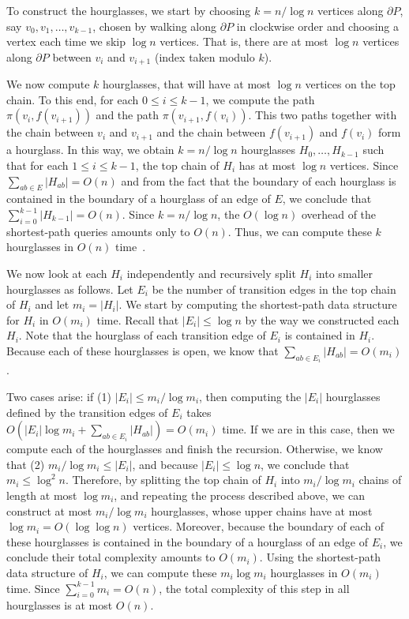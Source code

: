 \documentclass[a4paper,UKenglish]{lipics}
\newcommand{\ff}[1]{\ensuremath{f(#1)}}
\newcommand{\p}[2]{\ensuremath{\pi(#1, #2)}}
\begin{document}
To construct the hourglasses, we start by choosing $k = n/ \log n$ vertices along $\partial P$, say $v_0, v_1, \ldots, v_{k-1}$, chosen by walking along $\partial P$ in clockwise order and choosing a vertex each time we skip $\log n$ vertices. 
That is, there are at most $\log n$ vertices along $\partial P$ between $v_i$ and $v_{i+1}$ (index taken modulo $k$).

We now compute $k$ hourglasses, that will have at most $\log n$ vertices on the top chain. 
To this end, for each $0\leq i\leq k-1$, we compute the path $\p{v_i}{ \ff{v_{i+1}}}$ and the path $\p{v_{i+1}}{ \ff{v_i}}$. 
This two paths together with the chain between $v_i$ and $v_{i+1}$ and the chain between $\ff{v_{i+1}}$ and $\ff{v_i}$ form a hourglass. 
In this way, we obtain $k = n/\log n$ hourglasses $H_0, \ldots, H_{k-1}$ such that for each $1\leq i\leq k-1$, the top chain of $H_i$ has at most $\log n$ vertices.
Since $\sum_{ab\in E} |H_{ab}| = O(n)$ and from the fact that the boundary of each hourglass is contained in the boundary of a hourglass of an edge of $E$, we conclude that $\sum_{i=0} ^ {k-1} |H_{k-1}| = O(n)$.
Since $k = n/\log n$, the $O(\log n)$ overhead of the shortest-path queries amounts only to $O(n)$.
Thus, we can compute these $k$ hourglasses in $O(n)$ time~\cite{guibasShortestPathQueries}. 

We now look at each $H_i$ independently and recursively split $H_i$ into smaller hourglasses as follows.
Let $E_i$ be the number of transition edges in the top chain of $H_i$ and let $m_i = |H_i|$. 
We start by computing the shortest-path data structure for $H_i$ in $O(m_i)$ time.
Recall that $|E_i| \leq \log n$ by the way we constructed each $H_i$.
Note that the hourglass of each transition edge of $E_i$ is contained in $H_i$. 
Because each of these hourglasses is open, we know that $\sum_{ab\in E_i} |H_{ab}| = O(m_i)$. 

Two cases arise: if (1) $|E_i| \leq m_i / \log m_i$, then computing the $|E_i|$ hourglasses defined by the transition edges of $E_i$ takes $O(|E_i| \log m_i + \sum_{ab\in E_i} |H_{ab}|) = O(m_i)$ time. 
If we are in this case, then we compute each of the hourglasses and finish the recursion.
Otherwise, we know that (2) $m_i / \log m_i\leq |E_i|$, and because $|E_i| \leq \log n$, we conclude that $m_i \leq \log^2 n$.
Therefore, by splitting the top chain of $H_i$ into $m_i/\log m_i$ chains of length at most $\log m_i$, and repeating the process described above, we can construct at most $m_i / \log m_i$ hourglasses, whose upper chains have at most $\log m_i = O(\log \log n)$ vertices. 
Moreover, because the boundary of each of these hourglasses is contained in the boundary of a hourglass of an edge of $E_i$, we conclude their total complexity amounts to $O(m_i)$.
Using the shortest-path data structure of $H_i$, we can compute these $m_i\log m_i$ hourglasses in $O(m_i)$ time.
Since $\sum_{i = 0} ^{k-1} m_i = O(n)$, the total complexity of this step in all hourglasses is at most $O(n)$.
\end{document}

